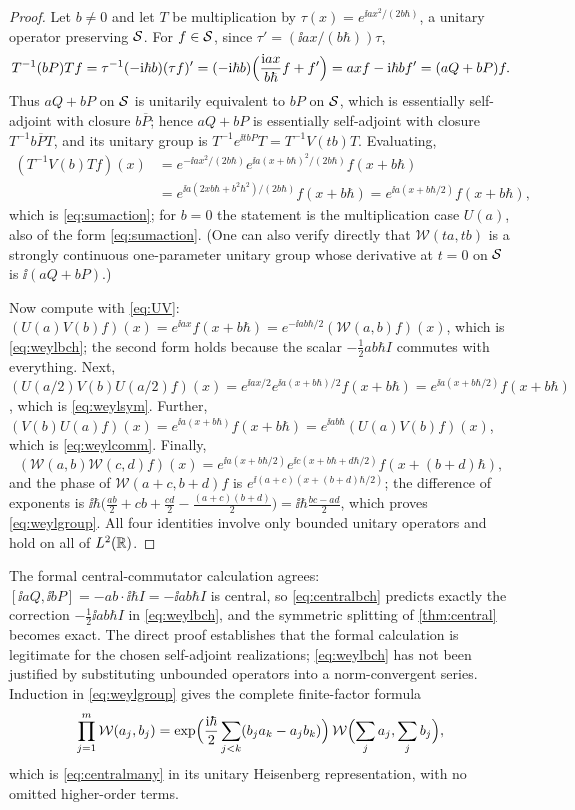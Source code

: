 \begin{proof}
Let $b\neq0$ and let $T$ be multiplication by $\tau(x)=e^{\ii ax^2/(2b\hbar)}$,
a unitary operator preserving $\mathcal{S}$. For $f\in\mathcal{S}$, since
$\tau'=(\ii ax/(b\hbar))\tau$,
\[
 T^{-1}(bP)Tf=\tau^{-1}(-\mathrm{i}\hbar b)(\tau f)'
 =(-\mathrm{i}\hbar b)\Bigl(\frac{\mathrm{i} ax}{b\hbar}f+f'\Bigr)=axf-\mathrm{i}\hbar bf'=(aQ+bP)f.
\]
Thus $aQ+bP$ on $\mathcal{S}$ is unitarily equivalent to $bP$ on $\mathcal{S}$, which is
essentially self-adjoint with closure $b\overline P$; hence $aQ+bP$ is
essentially self-adjoint with closure $T^{-1}b\overline PT$, and its unitary
group is $T^{-1}e^{\ii tbP}T=T^{-1}V(tb)T$. Evaluating,
\begin{align*}
 (T^{-1}V(b)Tf)(x)&=e^{-\ii ax^2/(2b\hbar)}e^{\ii a(x+b\hbar)^2/(2b\hbar)}f(x+b\hbar)\\
 &=e^{\ii a(2xb\hbar+b^2\hbar^2)/(2b\hbar)}f(x+b\hbar)=e^{\ii a(x+b\hbar/2)}f(x+b\hbar),
\end{align*}
which is \eqref{eq:sumaction}; for $b=0$ the statement is the multiplication
case $U(a)$, also of the form \eqref{eq:sumaction}. (One can also verify
directly that $\mathcal W(ta,tb)$ is a strongly continuous one-parameter
unitary group whose derivative at $t=0$ on $\mathcal{S}$ is $\ii(aQ+bP)$.)

Now compute with \eqref{eq:UV}: $(U(a)V(b)f)(x)=e^{\ii ax}f(x+b\hbar)
=e^{-\ii ab\hbar/2}(\mathcal W(a,b)f)(x)$, which is \eqref{eq:weylbch}; the
second form holds because the scalar $-\tfrac12ab\hbar I$ commutes with
everything. Next, $(U(a/2)V(b)U(a/2)f)(x)=e^{\ii ax/2}e^{\ii a(x+b\hbar)/2}f(x+b\hbar)
=e^{\ii a(x+b\hbar/2)}f(x+b\hbar)$, which is \eqref{eq:weylsym}. Further,
$(V(b)U(a)f)(x)=e^{\ii a(x+b\hbar)}f(x+b\hbar)=e^{\ii ab\hbar}(U(a)V(b)f)(x)$,
which is \eqref{eq:weylcomm}. Finally,
\[
 (\mathcal W(a,b)\mathcal W(c,d)f)(x)
 =e^{\ii a(x+b\hbar/2)}e^{\ii c(x+b\hbar+d\hbar/2)}f(x+(b+d)\hbar),
\]
and the phase of $\mathcal W(a+c,b+d)f$ is $e^{\ii(a+c)(x+(b+d)\hbar/2)}$;
the difference of exponents is
$\ii\hbar\bigl(\tfrac{ab}2+cb+\tfrac{cd}2-\tfrac{(a+c)(b+d)}2\bigr)=\ii\hbar\tfrac{bc-ad}2$,
which proves \eqref{eq:weylgroup}. All four identities involve only
bounded unitary operators and hold on all of $L^2(\mathbb{R})$.
\end{proof}
The formal central-commutator calculation agrees: $[\ii aQ,\ii bP]=-ab\cdot\ii\hbar I
=-\ii ab\hbar I$ is central, so \eqref{eq:centralbch} predicts exactly the
correction $-\tfrac12\ii ab\hbar I$ in \eqref{eq:weylbch}, and the symmetric
splitting of \cref{thm:central} becomes exact. The direct proof establishes
that the formal calculation is legitimate for the chosen self-adjoint
realizations; \eqref{eq:weylbch} has not been justified by substituting
unbounded operators into a norm-convergent series. Induction in
\eqref{eq:weylgroup} gives the complete finite-factor formula
\begin{equation}\label{eq:weylmulti}
 \prod_{j=1}^m\mathcal W(a_j,b_j)
 =\exp\Bigl(\frac{\mathrm{i}\hbar}{2}\sum_{j<k}(b_ja_k-a_jb_k)\Bigr)\,
 \mathcal W\Bigl(\sum_ja_j,\sum_jb_j\Bigr),
\end{equation}
which is \eqref{eq:centralmany} in its unitary Heisenberg representation,
with no omitted higher-order terms.


